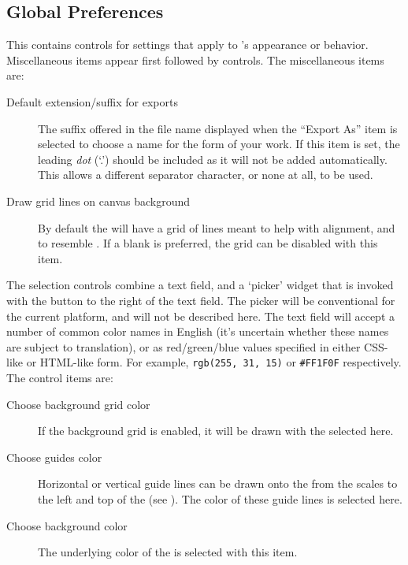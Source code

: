 		\subsection{Global Preferences}%
		\label{ssec:prefs_global}
		This  contains controls for settings that
		apply to \IXpkg{}'s appearance or behavior.
		Miscellaneous items appear first followed by
		  controls.
		The miscellaneous items are:
		
			\begin{description}
			  \item[Default extension/suffix for exports] The
			  suffix offered in the file name 
			  displayed when the ``Export As'' 
			  item is selected to choose a name for the
			  \IXpov{}  form of your work.
			  If this item is set, the leading \emph{dot}
			  (`.') should be included as it will not be
			  added automatically. This allows a different
			  separator character, or none at all, to be used.
			  \item[Draw grid lines on canvas background] By
			  default the  will have a
			  grid of lines meant to help with alignment, and
			  to resemble . If a blank
			   is preferred, the grid can be
			  disabled with this item.
			\end{description}

			The  selection controls combine a
			text field, and a `picker' widget that is invoked
			with the button to the right of the text field.
			The picker will be conventional for the current
			platform, and will not be described here. The text
			field will accept a number of common color names in
			English (it's uncertain whether these names are
			subject to translation), or as red/green/blue values
			specified in either CSS-like or HTML-like form.
			For example, \texttt{rgb(255, 31, 15)} or
			\texttt{\#FF1F0F}
			respectively. The  control items are:
			\begin{description}
			  \item[Choose background grid color] If the
			  background grid is enabled, it will be drawn
			  with the  selected here.
			  \item[Choose guides color] Horizontal or vertical
			  guide lines can be drawn onto the 
			  from the scales to the left and top of the
			   (see ).
			  The color of these guide lines is selected here.
			  \item[Choose background color] The underlying
			  color of the
			   is selected with this item.
			\end{description}

